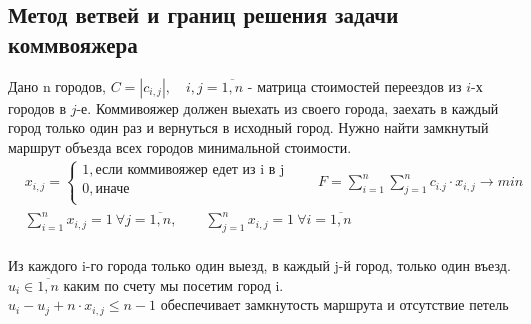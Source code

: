 \documentclass[17pt]{extarticle}
\begin{document}
\subsection*{Метод ветвей и границ решения задачи коммвояжера}
Дано n городов, $C = \left| c_{i,j} \right|, \quad i, j = \overline{1, n}$ - матрица стоимостей переездов из $i$-х городов в $j$-е.
Коммивояжер должен выехать из своего города, заехать в каждый город только один раз и вернуться в исходный город.
Нужно найти замкнутый маршрут объезда всех городов минимальной стоимости.
\[
    \begin{aligned}
         & x_{i,j} = \begin{cases} 1, \text{если коммивояжер едет из i в j} \\ 0, \text{иначе} \\ \end{cases}
        \qquad F=\sum_{i=1}^n \sum_{j=1}^n c_{i.j} \cdot x_{i,j} \rightarrow min                              \\
         & \sum_{i=1}^n x_{i,j} = 1 \ \forall j=\overline{1,n}, \qquad
        \sum_{j=1}^n x_{i,j} = 1 \ \forall i=\overline{1,n}                                                   \\
    \end{aligned}
\]

Из каждого i-го города только один выезд, в каждый j-й город, только один въезд. \\
$u_i \in \overline{1,n}$ каким по счету мы посетим город i. \\
$u_i-u_j + n \cdot x_{i,j} \leq n - 1$ обеспечивает замкнутость маршрута и отсутствие петель
\end{document}
